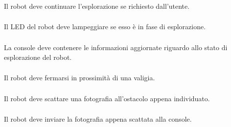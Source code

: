 \subsubsection[R-continueExplore]{}

Il robot deve continuare l'esplorazione se richiesto dall'utente.

\subsubsection[R-blinkLed]{}

Il LED del robot deve lampeggiare se esso è in fase di esplorazione.

\subsubsection[R-consoleUpdate]{}

La console deve contenere le informazioni aggiornate riguardo allo stato di esplorazione del robot.

\subsubsection[R-stopAtBag]{}

Il robot deve fermarsi in prossimità di una valigia.

\subsubsection[R-takePhoto]{}

Il robot deve scattare una fotografia all'ostacolo appena individuato.

\subsubsection[R-sendPhoto]{}

Il robot deve inviare la fotografia appena scattata alla console.

\subsubsection[R-alert]{}

